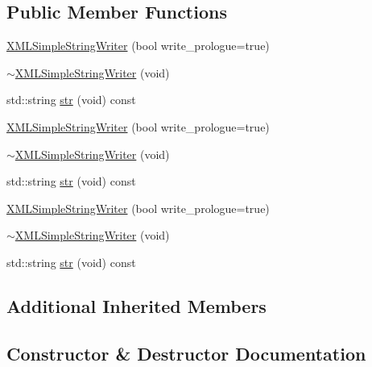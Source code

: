\subsection*{Public Member Functions}
\begin{DoxyCompactItemize}
\item 
\mbox{\hyperlink{classXMLWriterAPI_1_1XMLSimpleStringWriter_a7caa663dd64c87fa0eabc563154143a5}{X\+M\+L\+Simple\+String\+Writer}} (bool write\+\_\+prologue=true)
\item 
\mbox{\hyperlink{classXMLWriterAPI_1_1XMLSimpleStringWriter_a10b08cc22793241a637eefa425e0ebe5}{$\sim$\+X\+M\+L\+Simple\+String\+Writer}} (void)
\item 
std\+::string \mbox{\hyperlink{classXMLWriterAPI_1_1XMLSimpleStringWriter_ae316d9565925e9605c38eb0a14e99e90}{str}} (void) const
\item 
\mbox{\hyperlink{classXMLWriterAPI_1_1XMLSimpleStringWriter_a7caa663dd64c87fa0eabc563154143a5}{X\+M\+L\+Simple\+String\+Writer}} (bool write\+\_\+prologue=true)
\item 
\mbox{\hyperlink{classXMLWriterAPI_1_1XMLSimpleStringWriter_a10b08cc22793241a637eefa425e0ebe5}{$\sim$\+X\+M\+L\+Simple\+String\+Writer}} (void)
\item 
std\+::string \mbox{\hyperlink{classXMLWriterAPI_1_1XMLSimpleStringWriter_ae316d9565925e9605c38eb0a14e99e90}{str}} (void) const
\item 
\mbox{\hyperlink{classXMLWriterAPI_1_1XMLSimpleStringWriter_a7caa663dd64c87fa0eabc563154143a5}{X\+M\+L\+Simple\+String\+Writer}} (bool write\+\_\+prologue=true)
\item 
\mbox{\hyperlink{classXMLWriterAPI_1_1XMLSimpleStringWriter_a10b08cc22793241a637eefa425e0ebe5}{$\sim$\+X\+M\+L\+Simple\+String\+Writer}} (void)
\item 
std\+::string \mbox{\hyperlink{classXMLWriterAPI_1_1XMLSimpleStringWriter_ae316d9565925e9605c38eb0a14e99e90}{str}} (void) const
\end{DoxyCompactItemize}
\subsection*{Additional Inherited Members}


\subsection{Constructor \& Destructor Documentation}
\mbox{\label{classXMLWriterAPI_1_1XMLSimpleStringWriter_a7caa663dd64c87fa0eabc563154143a5}} 

